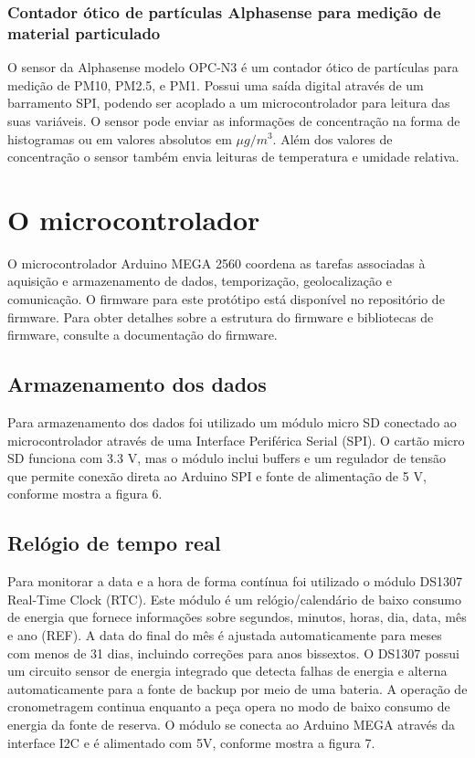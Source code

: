 \subsubsection{Contador ótico de partículas Alphasense para medição de material particulado}

O sensor da Alphasense modelo OPC-N3 é um contador ótico de partículas para medição de PM10, PM2.5, e PM1. Possui uma saída digital através de um barramento SPI, podendo ser acoplado a um microcontrolador para leitura das suas variáveis. O sensor pode enviar as informações de concentração na forma de histogramas ou em valores absolutos em \(\mu g/m^3\). Além dos valores de concentração o sensor também envia leituras de temperatura e umidade relativa.

\section{O microcontrolador}

O microcontrolador Arduino MEGA 2560 coordena as tarefas associadas à aquisição e armazenamento de dados, temporização, geolocalização e comunicação. O firmware para este protótipo está disponível no repositório de firmware. Para obter detalhes sobre a estrutura do firmware e bibliotecas de firmware, consulte a documentação do firmware.

\subsection{Armazenamento dos dados}

Para armazenamento dos dados foi utilizado um módulo micro SD conectado ao microcontrolador através de uma Interface Periférica Serial (SPI). O cartão micro SD funciona com 3.3 V, mas o módulo inclui buffers e um regulador de tensão que permite conexão direta ao Arduino SPI e fonte de alimentação de 5 V, conforme mostra a figura 6.

\subsection{Relógio de tempo real}

Para monitorar a data e a hora de forma contínua foi utilizado o módulo DS1307 Real-Time Clock (RTC). Este módulo é um relógio/calendário de baixo consumo de energia que fornece informações sobre segundos, minutos, horas, dia, data, mês e ano (REF). A data do final do mês é ajustada automaticamente para meses com menos de 31 dias, incluindo correções para anos bissextos. O DS1307 possui um circuito sensor de energia integrado que detecta falhas de energia e alterna automaticamente para a fonte de backup por meio de uma bateria. A operação de cronometragem continua enquanto a peça opera no modo de baixo consumo de energia da fonte de reserva. O módulo se conecta ao Arduino MEGA através da interface I2C e é alimentado com 5V, conforme mostra a figura 7.

